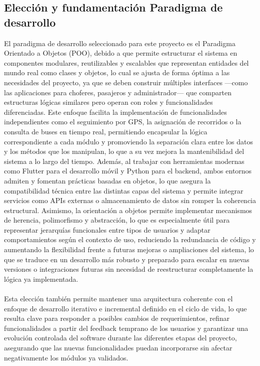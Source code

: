 \documentclass[12pt]{article}
\begin{document}
\newpage
\subsection{Elección y fundamentación Paradigma de desarrollo}
El paradigma de desarrollo seleccionado para este proyecto es el Paradigma Orientado a Objetos (POO), debido a que permite estructurar el sistema en componentes modulares, reutilizables y escalables que representan entidades del mundo real como clases y objetos, lo cual se ajusta de forma óptima a las necesidades del proyecto, ya que se deben construir múltiples interfaces —como las aplicaciones para choferes, pasajeros y administrador— que comparten estructuras lógicas similares pero operan con roles y funcionalidades diferenciadas. Este enfoque facilita la implementación de funcionalidades independientes como el seguimiento por GPS, la asignación de recorridos o la consulta de buses en tiempo real, permitiendo encapsular la lógica correspondiente a cada módulo y promoviendo la separación clara entre los datos y los métodos que los manipulan, lo que a su vez mejora la mantenibilidad del sistema a lo largo del tiempo. Además, al trabajar con herramientas modernas como Flutter para el desarrollo móvil y Python para el backend, ambos entornos admiten y fomentan prácticas basadas en objetos, lo que asegura la compatibilidad técnica entre las distintas capas del sistema y permite integrar servicios como APIs externas o almacenamiento de datos sin romper la coherencia estructural. Asimismo, la orientación a objetos permite implementar mecanismos de herencia, polimorfismo y abstracción, lo que es especialmente útil para representar jerarquías funcionales entre tipos de usuarios y adaptar comportamientos según el contexto de uso, reduciendo la redundancia de código y aumentando la flexibilidad frente a futuras mejoras o ampliaciones del sistema, lo que se traduce en un desarrollo más robusto y preparado para escalar en nuevas versiones o integraciones futuras sin necesidad de reestructurar completamente la lógica ya implementada.
\\\\Esta elección también permite mantener una arquitectura coherente con el enfoque de desarrollo iterativo e incremental definido en el ciclo de vida, lo que resulta clave para responder a posibles cambios de requerimientos, refinar funcionalidades a partir del feedback temprano de los usuarios y garantizar una evolución controlada del software durante las diferentes etapas del proyecto, asegurando que las nuevas funcionalidades puedan incorporarse sin afectar negativamente los módulos ya validados.
\end{document}
